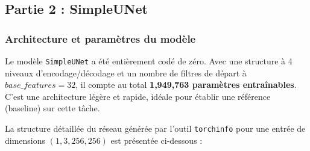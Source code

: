 \documentclass[12pt, a4paper]{article}
\begin{document}
\subsection{Partie 2 : SimpleUNet}

\subsubsection*{Architecture et paramètres du modèle}
Le modèle \texttt{SimpleUNet} a été entièrement codé de zéro. Avec une structure à 4 niveaux d'encodage/décodage et un nombre de filtres de départ à $base\_features=32$, il compte au total \textbf{1,949,763 paramètres entraînables}. C'est une architecture légère et rapide, idéale pour établir une référence (baseline) sur cette tâche.

La structure détaillée du réseau générée par l'outil \texttt{torchinfo} pour une entrée de dimensions $(1, 3, 256, 256)$ est présentée ci-dessous :
\end{document}
